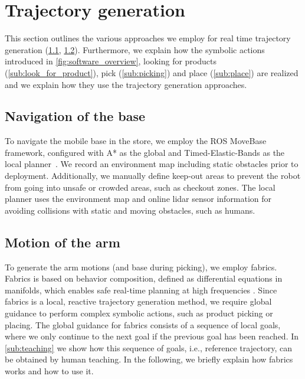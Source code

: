 \section{Trajectory generation}
\label{sec:trajectory_generation}


This section outlines the various approaches we employ
for real time trajectory generation
(\cref{sub:base_motion}, \cref{sub:arm_motion}).
Furthermore, we explain how the symbolic actions introduced
in \cref{fig:software_overview}, 
looking for products
(\cref{sub:look_for_product}), pick
(\cref{sub:picking}) and place (\cref{sub:place})
are realized and we
explain how they use the trajectory generation approaches.

\subsection{Navigation of the base}
\label{sub:base_motion}
To navigate the mobile base in the store, we employ the ROS MoveBase framework, configured with A* as the global and Timed-Elastic-Bands as the local planner~\cite{rosmann2017integrated}.
We record an environment map including static obstacles prior to deployment.
Additionally, we manually define keep-out
areas to prevent the robot from going into unsafe or crowded areas, such as checkout zones. The local planner uses the environment map and online lidar sensor information for avoiding collisions with static and moving obstacles, such as humans.

\subsection{Motion of the arm}
\label{sub:arm_motion}
To generate the arm motions (and base during picking),
we employ \ac{fabrics}. Fabrics is based on
behavior composition, defined as differential
equations in manifolds, which enables safe
real-time planning at high frequencies
\cite{ratliff2023fabrics,van2022geometric,Spahn2023}. Since
\ac{fabrics} is a local, reactive trajectory generation
method, we require global guidance to perform complex
symbolic actions, such as product picking or placing. The global
guidance for fabrics consists of a sequence of
local goals, where we only continue to the next goal if the
previous goal has been reached. In \cref{sub:teaching} we
show how this sequence of goals, i.e., reference trajectory,
can be obtained by human teaching. In the following, we briefly explain how \ac{fabrics} works and how to use it.



